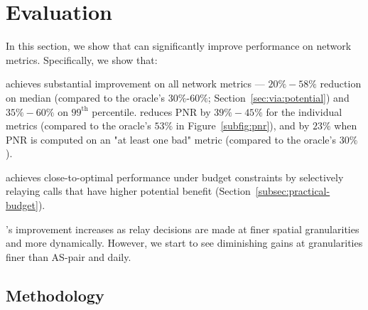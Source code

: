 \section{Evaluation}
\label{sec:via:eval}

In this section, we show that \hybrid can significantly improve performance on network metrics.
Specifically, we show that:
\begin{packeditemize}
\item \hybrid achieves substantial improvement on all network metrics --- $20\%-58\%$ reduction on median (compared to the oracle's $30\%$-$60\%$; Section~\ref{sec:via:potential}) and  %
$35\%-60\%$ on $99^\text{th}$ percentile. \hybrid reduces PNR by $39\%-45\%$ for the individual metrics (compared to the oracle's $53\%$ in Figure~\ref{subfig:pnr}), and by $23\%$ when PNR is computed on an "at least one bad" metric (compared to the oracle's $30\%$).
\item \hybrid achieves close-to-optimal performance under budget constraints by selectively relaying calls that have higher potential benefit (Section~\ref{subsec:practical-budget}).%
\item {\hybrid}'s improvement increases as relay decisions are made at finer spatial granularities and more dynamically. However, we start to see diminishing gains at granularities finer than AS-pair and daily.
\end{packeditemize}


\subsection{Methodology}
\label{subsec:eval-method}

